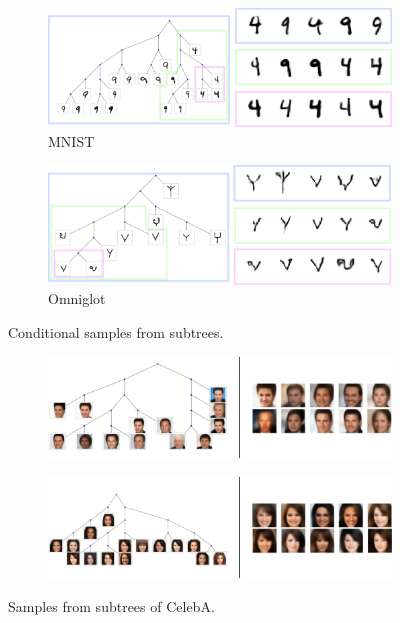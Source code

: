\begin{figure}[h]
\centering
\begin{subfigure}[t]{0.8\textwidth}
\centering
\includegraphics[width=\textwidth]{img/loracs/mnist/mnist-samples.png}
\caption{MNIST}
\end{subfigure}
\begin{subfigure}[t]{0.8\textwidth}
\centering
\includegraphics[width=\textwidth]{img/loracs/omniglot/omniglot-samples.png}
\caption{Omniglot}
\end{subfigure}
\caption{Conditional samples from subtrees.}
\label{fig:subtree-samples}
\end{figure}


\begin{figure}[h]
\centering
\begin{subfigure}[t]{0.8\textwidth}
\centering
\includegraphics[frame, width=\textwidth]{img/loracs/celeba/celeba-samples-1.png}
\end{subfigure}
\begin{subfigure}[t]{0.8\textwidth}
\centering
\includegraphics[frame, width=\textwidth]{img/loracs/celeba/celeba-samples-2.png}
\end{subfigure}
\caption{Samples from subtrees of CelebA.}
\label{fig:celeba-samples}
\end{figure}

